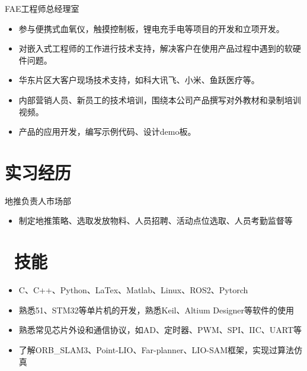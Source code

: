 \documentclass{resume}
\begin{document}
FAE工程师\qquad 总经理室
\begin{itemize}
  
  \item 参与便携式血氧仪，触摸控制板，锂电充手电等项目的开发和立项开发。
  \item 对嵌入式工程师的工作进行技术支持，解决客户在使用产品过程中遇到的软硬件问题。
  \item 华东片区大客户现场技术支持，如科大讯飞、小米、鱼跃医疗等。 
  \item 内部营销人员、新员工的技术培训，围绕本公司产品撰写对外教材和录制培训视频。
  \item 产品的应用开发，编写示例代码、设计demo板。
\end{itemize}

\section{\textcolor[RGB]{50,50,190}{\faAlignLeft 实习经历}}

地推负责人\qquad \qquad \quad 市场部
\begin{itemize}
  \item 制定地推策略、选取发放物料、人员招聘、活动点位选取、人员考勤监督等
\end{itemize}

\section{\textcolor[RGB]{50,50,190}{\faCogs\ 技能}}
\begin{itemize}[parsep=0.5ex]
  \item C、C++、Python、LaTex、Matlab、Linux、ROS2、Pytorch
  \item 熟悉51、STM32等单片机的开发，熟悉Keil、Altium Designer等软件的使用
  \item 熟悉常见芯片外设和通信协议，如AD、定时器、PWM、SPI、IIC、UART等
  \item 了解ORB\_SLAM3、Point-LIO、Far-planner、LIO-SAM框架，实现过算法仿真
\end{itemize}
\end{document}

